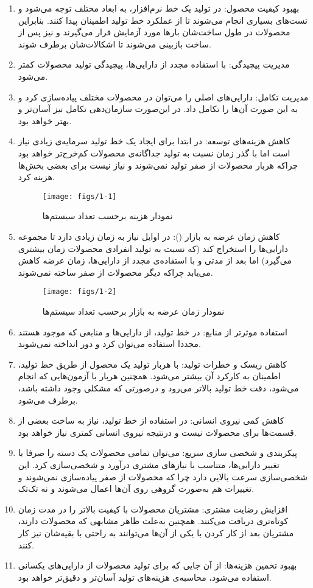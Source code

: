 {\begin{enumerate}
\item 
بهبود کیفیت محصول: در تولید یک خط نرم‌افزار، به ابعاد مختلف توجه می‌شود و تست‌های بسیاری انجام می‌شوند تا از عملکرد خط تولید اطمینان پیدا کنند. بنابراین محصولات در طول ساخت‌شان بارها مورد آزمایش قرار می‌گیرند و نیز پس از ساخت‌ بازبینی می‌شوند تا اشکالات‌شان برطرف شوند.
\item 
مدیریت پیچیدگی: با استفاده‌ مجدد از دارایی‌ها، پیچیدگی تولید محصولات کمتر می‌شود.
\item
مدیریت تکامل: دارایی‌های اصلی را می‌توان در محصولات مختلف پیاده‌سازی کرد و به این صورت آن‌ها را تکامل داد. در این‌صورت سازمان‌دهی تکامل نیز آسان‌تر و بهتر خواهد بود.
\item 
کاهش هزینه‌های توسعه: در ابتدا برای ایجاد یک خط تولید سرمایه‌ی زیادی نیاز است اما با گذر زمان نسبت به تولید جداگانه‌ی محصولات کم‌خرج‌تر خواهد بود چراکه هربار محصولات از صفر تولید نمی‌شوند و نیاز نیست برای بعضی بخش‌ها هزینه‌ کرد.
\begin{figure}[h]
	\centering
	\texttt{[image: figs/1-1]}
	\caption{نمودار هزینه‌ برحسب تعداد سیستم‌ها}
\end{figure}

\item 
کاهش زمان عرضه به بازار  ():
در اوایل  نیاز به زمان زیادی دارد تا مجموعه دارایی‌ها را استخراج کند (که نسبت به تولید انفرادی محصولات زمان بیشتری می‌گیرد) اما بعد از مدتی و با استفاده‌ی مجدد از دارایی‌ها، زمان عرضه کاهش می‌یابد چراکه دیگر محصولات از صفر ساخته نمی‌شوند.

\begin{figure}[h]
	\centering
	\texttt{[image: figs/1-2]}
	\caption{نمودار زمان عرضه به بازار‌ برحسب تعداد سیستم‌ها}
\end{figure}

\item
استفاده موثرتر از منابع: در خط تولید، از دارایی‌ها و منابعی که موجود هستند مجددا استفاده می‌توان کرد و دور انداخته نمی‌شوند.
\item 
کاهش ریسک و خطرات تولید: با هربار تولید یک محصول از طریق خط تولید، اطمینان به کارکرد آن بیشتر می‌شود. همچنین هربار با آزمون‌هایی که انجام می‌شود، دقت خط تولید بالاتر می‌رود و درصورتی که مشکلی وجود داشته باشد، برطرف می‌شود.
\item 
کاهش کمی نیروی انسانی: در استفاده از خط تولید، نیاز به ساخت بعضی از قسمت‌ها برای محصولات نیست و درنتیجه نیروی انسانی‌ کمتری نیاز خواهد بود.
\item 
پیکربندی و شخصی سازی سریع: می‌توان تمامی محصولات یک دسته را صرفا با تغییر دارایی‌ها، متناسب با نیازهای مشتری درآورد و شخصی‌سازی کرد. این شخصی‌سازی سرعت بالایی دارد چرا که محصولات از صفر پیاده‌سازی نمی‌شوند و تغییرات هم به‌صورت گروهی روی آن‌ها اعمال می‌شوند و نه تک‌تک.
\item
افزایش رضایت مشتری: مشتریان محصولات با کیفیت بالاتر را در مدت زمان کوتاه‌تری دریافت می‌کنند. همچنین به‌علت ظاهر مشابهی که محصولات دارند، مشتریان بعد از کار کردن با یکی از آن‌ها می‌توانند به راحتی با بقیه‌شان نیز کار کنند.
\item
بهبود تخمين هزينه‌ها: از آن جایی که برای تولید محصولات از دارایی‌های یکسانی استفاده می‌شود، محاسبه‌ی هزینه‌های تولید آسان‌تر و دقیق‌تر خواهد بود.


\end{enumerate}}
